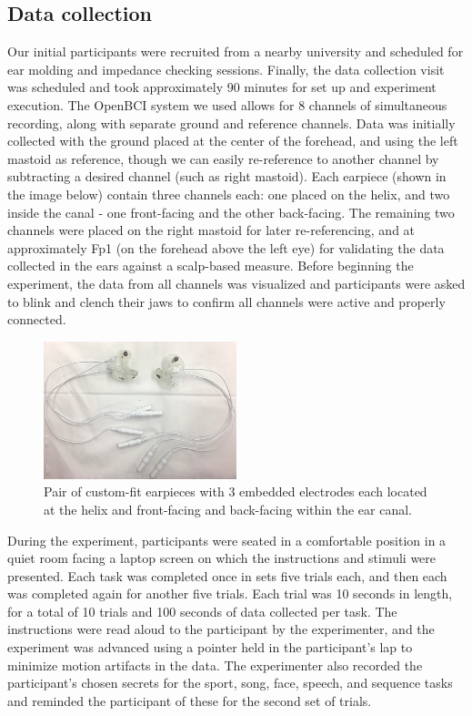 \documentclass[11pt]{article}
\begin{document}
\subsection{Data collection}
\label{sec:org20a2071}

Our initial participants were recruited from a nearby university and scheduled for ear molding
and impedance checking sessions. Finally, the data collection visit was scheduled and took
approximately 90 minutes for set up and experiment execution. The OpenBCI system we used
allows for 8 channels of simultaneous recording, along with separate ground and reference channels.
Data was initially collected with the ground placed at the center of the forehead, and using the left
mastoid as reference, though we can easily re-reference to another channel by subtracting a desired
channel (such as right mastoid). Each earpiece (shown in the image below) contain three channels each: 
one placed on the helix, and two inside the canal - one front-facing and the other back-facing. The remaining
two channels were placed on the right mastoid for later re-referencing, and at approximately Fp1 (on the 
forehead above the left eye) for validating the data collected in the ears against a scalp-based measure. 
Before beginning the experiment, the data from all channels was visualized and participants were asked to
blink and clench their jaws to confirm all channels were active and properly connected.

\begin{figure}[h]
\centering
\includegraphics[width=0.5\textwidth]{2EEEG.jpg}
\caption{Pair of custom-fit earpieces with 3 embedded electrodes each located at the helix and front-facing
and back-facing within the ear canal.}
\end{figure}

During the experiment, participants were seated in a comfortable position in a quiet room facing a laptop screen on which the
instructions and stimuli were presented. Each task was completed once in sets five trials each, and then
each was completed again for another five trials. Each trial was 10 seconds in length, for a total of 10 trials and 
100 seconds of data collected per task. The instructions were read aloud to the participant by the experimenter, and
the experiment was advanced using a pointer held in the participant's lap to minimize motion artifacts in the data.  
The experimenter also recorded the participant's chosen secrets for the sport, song, face, speech, and sequence
 tasks and reminded the participant of these for the second set of trials.
\end{document}
